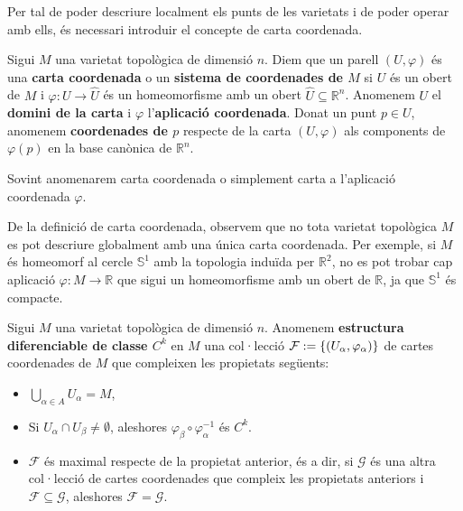 Per tal de poder descriure localment els punts de les varietats i de poder operar amb ells, és necessari introduir el concepte de carta coordenada. 

\begin{defi}
    Sigui $M$ una varietat topològica de dimensió $n$. Diem que un parell $(U,\varphi)$ és una \textbf{carta coordenada} o un \textbf{sistema de coordenades de $M$} si $U$ és un obert de $M$ i $\varphi:U\to\hat U$ és un homeomorfisme amb un obert $\hat U\subseteq\mathbb R^n$. Anomenem $U$ el \textbf{domini de la carta} i $\varphi$ l'\textbf{aplicació coordenada}. Donat un punt $p\in U$, anomenem \textbf{coordenades de $p$} respecte de la carta $(U,\varphi)$ als components de $\varphi(p)$ en la base canònica de $\mathbb R^n$.
\end{defi}
\begin{nota}
    Sovint anomenarem carta coordenada o simplement carta a l'aplicació coordenada $\varphi$.
\end{nota}

\begin{obs}
    De la definició de carta coordenada, observem que no tota varietat topològica $M$ es pot descriure globalment amb una única carta coordenada. Per exemple, si $M$ és homeomorf al cercle $\mathbb S^1$ amb la topologia induïda per $\mathbb R^2$, no es pot trobar cap aplicació $\varphi:M\to\mathbb R$ que sigui un homeomorfisme amb un obert de $\mathbb R$, ja que $\mathbb S^1$ és compacte.
\end{obs}

\begin{defi}
    Sigui $M$ una varietat topològica de dimensió $n$. Anomenem \textbf{estructura diferenciable de classe $C^k$} en $M$ una col·lecció $\mathcal F:=\{(U_\alpha,\varphi_\alpha)\}$ de cartes coordenades de $M$ que compleixen les propietats següents:
    \begin{itemize}
        \item $\bigcup_{\alpha\in A} U_\alpha = M$,
        \item Si $U_\alpha\cap U_\beta\neq\emptyset$, aleshores $\varphi_\beta\circ\varphi_\alpha^{-1}$ és $C^k$.
        \item $\mathcal F$ és maximal respecte de la propietat anterior, és a dir, si $\mathcal G$ és una altra col·lecció de cartes coordenades que compleix les propietats anteriors i $\mathcal F\subseteq\mathcal G$, aleshores $\mathcal F = \mathcal G$.
    \end{itemize}
\end{defi}

